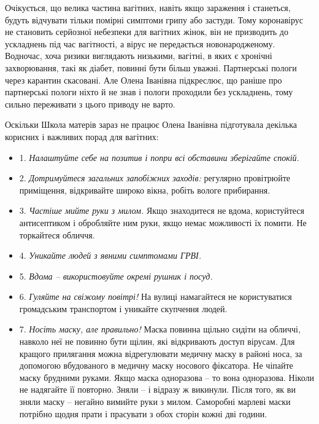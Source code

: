 Очікується, що велика частина вагітних, навіть якщо зараження і станеться,
будуть відчувати тільки помірні симптоми грипу або застуди. Тому коронавірус не
становить серйозної небезпеки для вагітних жінок, він не призводить до
ускладнень під час вагітності, а вірус не передається новонародженому.
Водночас, хоча ризики виглядають низькими, вагітні, в яких є хронічні
захворювання, такі як діабет, повинні бути більш уважні. Партнерські пологи
через карантин скасовані. Але Олена Іванівна підкреслює, що раніше про
партнерські пологи ніхто й не знав і пологи проходили без ускладнень, тому
сильно переживати з цього приводу не варто.

Оскільки Школа матерів зараз не працює Олена Іванівна підготувала декілька
корисних і важливих порад для вагітних:

\begin{itemize} %
\item 1. \emph{Налаштуйте себе на позитив і попри всі обставини зберігайте спокій.}

\item 2. \emph{Дотримуйтеся загальних запобіжних заходів:} регулярно провітрюйте приміщення,
відкривайте широко вікна, робіть вологе прибирання.

\item 3. \emph{Частіше мийте руки з милом.} Якщо знаходитеся не вдома, користуйтеся
антисептиком і обробляйте ним руки, якщо немає можливості їх помити. Не
торкайтеся обличчя.

\item 4. \emph{Уникайте людей з явними симптомами ГРВІ.}

\item 5. \emph{Вдома – використовуйте окремі рушник і посуд.}

\item 6. \emph{Гуляйте на свіжому повітрі!} На вулиці намагайтеся не користуватися
громадським транспортом і уникайте скупчення людей.

\item 7. \emph{Носіть маску, але правильно!} Маска повинна щільно сидіти на обличчі, навколо
неї не повинно бути щілин, які відкривають доступ вірусам. Для кращого
прилягання можна відрегулювати медичну маску в районі носа, за допомогою
вбудованого в медичну маску носового фіксатора. Не чіпайте маску брудними
руками. Якщо маска одноразова – то вона одноразова. Ніколи не надягайте її
повторно. Зняли – і відразу ж викинули. Після того, як ви зняли маску – негайно
вимийте руки з милом. Саморобні марлеві маски потрібно щодня прати і прасувати
з обох сторін кожні дві години.


\end{itemize}
